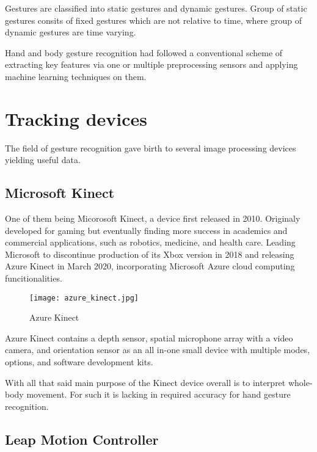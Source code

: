 
Gestures are classified into static gestures and dynamic gestures. Group of static gestures consits of fixed gestures which are not relative to time, where group of dynamic gestures are time varying.

Hand and body gesture recognition had followed a conventional scheme of extracting key features via one or multiple preprocessing sensors and applying machine learning techniques on them.\cite{avola}

\section{Tracking devices}
The field of gesture recognition gave birth to several image processing devices yielding useful data. 
\subsection{Microsoft Kinect}
One of them being Micorosoft Kinect, a device first released in 2010. Originaly developed for gaming but eventually finding more success in academics and commercial applications, such as robotics, medicine, and health care. Leading Microsoft to discontinue production of its Xbox version in 2018 and releasing Azure Kinect in March 2020, incorporating Microsoft Azure cloud computing funcitionalities.

\begin{figure}[ht]
	\centering
    \texttt{[image: azure\_kinect.jpg]}
	\caption{Azure Kinect \cite{azurekinect_pic}}
	\label{fig:azureKincet}
\end{figure}

Azure Kinect contains a depth sensor, spatial microphone array with a video camera, and orientation sensor as an all in-one small device with multiple modes, options, and software development kits.\cite{azurekinect}

With all that said main purpose of the Kinect device overall is to interpret whole-body movement. For such it is lacking in required accuracy for hand gesture recognition. 

\subsection{Leap Motion Controller}

